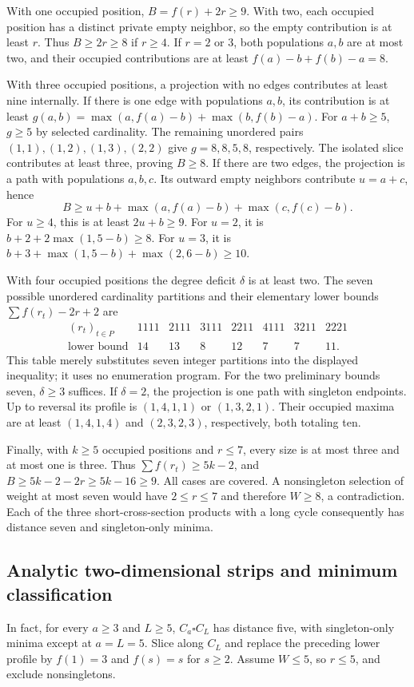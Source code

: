 With one occupied position, $B=f(r)+2r\ge9$. With two, each occupied position has a distinct private empty neighbor, so the empty contribution is at least $r$. Thus $B\ge2r\ge8$ if $r\ge4$. If $r=2$ or $3$, both populations $a,b$ are at most two, and their occupied contributions are at least $f(a)-b+f(b)-a=8$.

With three occupied positions, a projection with no edges contributes at least nine internally. If there is one edge with populations $a,b$, its contribution is at least $g(a,b)=\max(a,f(a)-b)+\max(b,f(b)-a)$. For $a+b\ge5$, $g\ge5$ by selected cardinality. The remaining unordered pairs $(1,1),(1,2),(1,3),(2,2)$ give $g=8,8,5,8$, respectively. The isolated slice contributes at least three, proving $B\ge8$. If there are two edges, the projection is a path with populations $a,b,c$. Its outward empty neighbors contribute $u=a+c$, hence
\[
 B\ge u+b+\max(a,f(a)-b)+\max(c,f(c)-b).
\]
For $u\ge4$, this is at least $2u+b\ge9$. For $u=2$, it is $b+2+2\max(1,5-b)\ge8$. For $u=3$, it is $b+3+\max(1,5-b)+\max(2,6-b)\ge10$.

With four occupied positions the degree deficit $\delta$ is at least two. The seven possible unordered cardinality partitions and their elementary lower bounds $\sum f(r_t)-2r+2$ are
\[
\begin{array}{c|rrrrrrr}
(r_t)_{t\in P}&1111&2111&3111&2211&4111&3211&2221\\\hline
\text{lower bound}&14&13&8&12&7&7&11.
\end{array}
\]
This table merely substitutes seven integer partitions into the displayed inequality; it uses no enumeration program. For the two preliminary bounds seven, $\delta\ge3$ suffices. If $\delta=2$, the projection is one path with singleton endpoints. Up to reversal its profile is $(1,4,1,1)$ or $(1,3,2,1)$. Their occupied maxima are at least $(1,4,1,4)$ and $(2,3,2,3)$, respectively, both totaling ten.

Finally, with $k\ge5$ occupied positions and $r\le7$, every size is at most three and at most one is three. Thus $\sum f(r_t)\ge5k-2$, and $B\ge5k-2-2r\ge5k-16\ge9$. All cases are covered. A nonsingleton selection of weight at most seven would have $2\le r\le7$ and therefore $W\ge8$, a contradiction. Each of the three short-cross-section products with a long cycle consequently has distance seven and singleton-only minima.

\subsection*{Analytic two-dimensional strips and minimum classification}
In fact, for every $a\ge3$ and $L\ge5$, $C_a\square C_L$ has distance five, with singleton-only minima except at $a=L=5$. Slice along $C_L$ and replace the preceding lower profile by $f(1)=3$ and $f(s)=s$ for $s\ge2$. Assume $W\le5$, so $r\le5$, and exclude nonsingletons.

